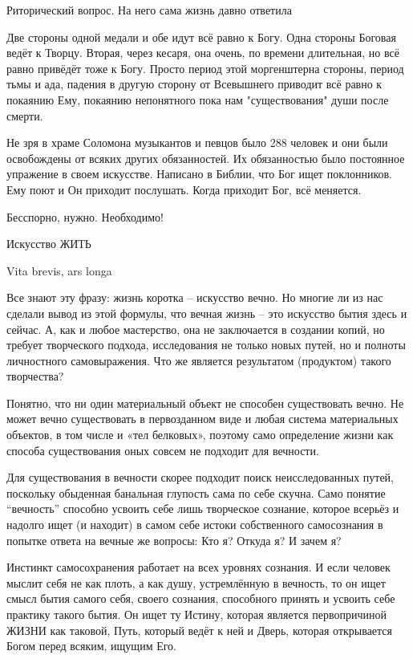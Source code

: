 \begin{itemize}

Риторический вопрос. На него сама жизнь давно ответила

Две стороны одной медали и обе идут всё равно к Богу. Одна стороны Боговая
ведёт к Творцу. Вторая, через кесаря, она очень, по времени длительная, но всё
равно привёдёт тоже к Богу. Просто период этой моргенштерна стороны, период
тьмы и ада, падения в другую сторону от Всевышнего приводит всё равно к
покаянию Ему, покаянию непонятного пока нам "существования" души после смерти.


Не зря в храме Соломона музыкантов и певцов было 288 человек и они были
освобождены от всяких других обязанностей. Их обязанностью было постоянное
упражение в своем искусстве. Написано в Библии, что Бог ищет поклонников. Ему
поют и Он приходит послушать. Когда приходит Бог, всё меняется.


Бесспорно, нужно. Необходимо!


Искусство ЖИТЬ

Vita brevis, ars longa

Все знают эту фразу: жизнь коротка – искусство вечно. Но многие ли из нас
сделали вывод из этой формулы, что вечная жизнь – это искусство бытия здесь и
сейчас. А, как и любое мастерство, она не заключается в создании копий, но
требует творческого подхода, исследования не только новых путей, но и полноты
личностного самовыражения. Что же является результатом (продуктом) такого
творчества?

Понятно, что ни один материальный объект не способен существовать вечно. Не
может вечно существовать в первозданном виде и любая система материальных
объектов, в том числе и «тел белковых», поэтому само определение жизни как
способа существования оных совсем не подходит для вечности.

Для существования в вечности скорее подходит поиск неисследованных путей,
поскольку обыденная банальная глупость сама по себе скучна. Само понятие
\enquote{вечность} способно усвоить себе лишь творческое сознание, которое всерьёз и
надолго ищет (и находит) в самом себе истоки собственного самосознания в
попытке ответа на вечные же вопросы: Кто я? Откуда я? И зачем я?

Инстинкт самосохранения работает на всех уровнях сознания. И если человек
мыслит себя не как плоть, а как душу, устремлённую в вечность, то он ищет смысл
бытия самого себя, своего сознания, способного принять и усвоить себе практику
такого бытия. Он ищет ту Истину, которая является первопричиной ЖИЗНИ как
таковой, Путь, который ведёт к ней и Дверь, которая открывается Богом перед
всяким, ищущим Его.


\end{itemize}

